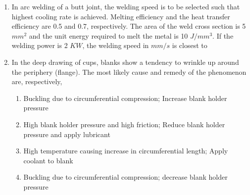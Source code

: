\documentclass[journal]{IEEEtran}
\numberwithin{equation}{enumi}
\numberwithin{figure}{enumi}
\begin{document}
\begin{enumerate}
\begin{enumerate}
  
\end{enumerate}

\item In arc welding of a butt joint, the welding speed is to be selected such that highest cooling rate is achieved. Melting efficiency and the heat transfer efficiency are 0.5 and 0.7, respectively. The area of the weld cross section is 5 $mm^2$ and the unit energy required to melt the metal is 10 $J/mm^3$. If the welding power is 2 $KW$, the welding speed in $mm/s$ is closest to 
\hfill{}
\begin{enumerate}

\end{enumerate}
\item In the deep drawing of cups, blanks show a tendency to wrinkle up around the periphery (flange). The most likely cause and remedy of the phenomenon are, respectively,
\hfill{}

\begin{enumerate}
    \item Buckling due to circumferential compression; Increase blank holder pressure
    \item High blank holder pressure and high friction; Reduce blank holder pressure and apply lubricant
    \item High temperature causing increase in circumferential length; Apply coolant to blank
    \item Buckling due to circumferential compression; decrease blank holder pressure
\end{enumerate}

\end{enumerate}
\end{document}
